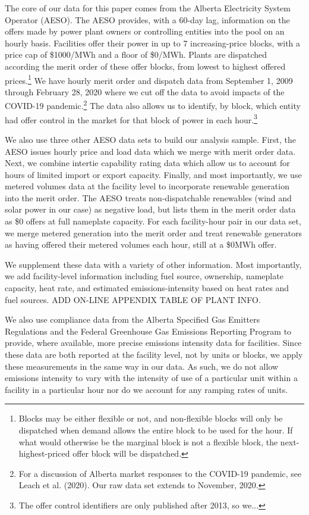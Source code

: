 \documentclass[12pt]{article}
\begin{document}
The core of our data for this paper comes from the Alberta Electricity System Operator (AESO). The AESO provides, with a 60-day lag, information on the offers made by power plant owners or controlling entities into the pool on an hourly basis. Facilities offer their power in up to 7 increasing-price blocks, with a price cap of \$1000/MWh and a floor of \$0/MWh. Plants are dispatched according the merit order of these offer blocks, from lowest to highest offered prices.\footnote{Blocks may be either flexible or not, and non-flexible blocks will only be dispatched when demand allows the entire block to be used for the hour. If what would otherwise be the marginal block is not a flexible block, the next-highest-priced offer block will be dispatched.} We have hourly merit order and dispatch data from September 1, 2009 through February 28, 2020 where we cut off the data to avoid impacts of the COVID-19 pandemic.\footnote{For a discussion of Alberta market responses to the COVID-19 pandemic, see Leach et al. (2020). Our raw data set extends to November, 2020.} The data also allows us to identify, by block, which entity had offer control in the market for that block of power in each hour.\footnote{The offer control identifiers are only published after 2013, so we...}

We also use three other AESO data sets to build our analysis sample. First, the AESO issues hourly price and load data which we merge with merit order data. Next, we combine intertie capability rating data which allow us to account for hours of limited import or export capacity. Finally, and most importantly, we use metered volumes data at the facility level to incorporate renewable generation into the merit order. The AESO treats non-dispatchable renewables (wind and solar power in our case) as negative load, but lists them in the merit order data as \$0 offers at full nameplate capacity. For each facility-hour pair in our data set, we merge metered generation into the merit order and treat renewable generators as having offered their metered volumes each hour, still at a \$0MWh offer.

We supplement these data with a variety of other information.  Most importantly, we add facility-level information including fuel source, ownership, nameplate capacity, heat rate, and estimated emissions-intensity based on heat rates and fuel sources.  ADD ON-LINE APPENDIX TABLE OF PLANT INFO.

We also use compliance data from the Alberta Specified Gas Emitters Regulations and the Federal Greenhouse Gas Emissions Reporting Program to provide, where available, more precise emissions intensity data for facilities.  Since these data are both reported at the facility level, not by units or blocks, we apply these measurements in the same way in our data.  As such, we do not allow emissions intensity to vary with the intensity of use of a particular unit within a facility in a particular hour nor do we account for any ramping rates of units.
\end{document}
